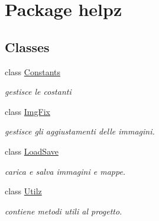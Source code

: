 \hypertarget{namespacehelpz}{}\section{Package helpz}
\label{namespacehelpz}
\subsection*{Classes}
\begin{DoxyCompactItemize}
\item 
class \hyperlink{classhelpz_1_1_constants}{Constants}
\begin{DoxyCompactList}\small\item\em gestisce le costanti \end{DoxyCompactList}\item 
class \hyperlink{classhelpz_1_1_img_fix}{Img\+Fix}
\begin{DoxyCompactList}\small\item\em gestisce gli aggiustamenti delle immagini. \end{DoxyCompactList}\item 
class \hyperlink{classhelpz_1_1_load_save}{Load\+Save}
\begin{DoxyCompactList}\small\item\em carica e salva immagini e mappe. \end{DoxyCompactList}\item 
class \hyperlink{classhelpz_1_1_utilz}{Utilz}
\begin{DoxyCompactList}\small\item\em contiene metodi utili al progetto. \end{DoxyCompactList}\end{DoxyCompactItemize}
